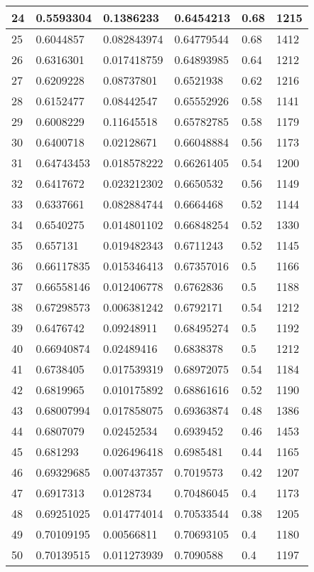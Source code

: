 \begin{longtable}{|l|l|l|l|l|l|}
24 & 0.5593304 & 0.1386233 & 0.6454213 & 0.68 & 1215 \\ \hline 
25 & 0.6044857 & 0.082843974 & 0.64779544 & 0.68 & 1412 \\ \hline 
26 & 0.6316301 & 0.017418759 & 0.64893985 & 0.64 & 1212 \\ \hline 
27 & 0.6209228 & 0.08737801 & 0.6521938 & 0.62 & 1216 \\ \hline 
28 & 0.6152477 & 0.08442547 & 0.65552926 & 0.58 & 1141 \\ \hline 
29 & 0.6008229 & 0.11645518 & 0.65782785 & 0.58 & 1179 \\ \hline 
30 & 0.6400718 & 0.02128671 & 0.66048884 & 0.56 & 1173 \\ \hline 
31 & 0.64743453 & 0.018578222 & 0.66261405 & 0.54 & 1200 \\ \hline 
32 & 0.6417672 & 0.023212302 & 0.6650532 & 0.56 & 1149 \\ \hline 
33 & 0.6337661 & 0.082884744 & 0.6664468 & 0.52 & 1144 \\ \hline 
34 & 0.6540275 & 0.014801102 & 0.66848254 & 0.52 & 1330 \\ \hline 
35 & 0.657131 & 0.019482343 & 0.6711243 & 0.52 & 1145 \\ \hline 
36 & 0.66117835 & 0.015346413 & 0.67357016 & 0.5 & 1166 \\ \hline 
37 & 0.66558146 & 0.012406778 & 0.6762836 & 0.5 & 1188 \\ \hline 
38 & 0.67298573 & 0.006381242 & 0.6792171 & 0.54 & 1212 \\ \hline 
39 & 0.6476742 & 0.09248911 & 0.68495274 & 0.5 & 1192 \\ \hline 
40 & 0.66940874 & 0.02489416 & 0.6838378 & 0.5 & 1212 \\ \hline 
41 & 0.6738405 & 0.017539319 & 0.68972075 & 0.54 & 1184 \\ \hline 
42 & 0.6819965 & 0.010175892 & 0.68861616 & 0.52 & 1190 \\ \hline 
43 & 0.68007994 & 0.017858075 & 0.69363874 & 0.48 & 1386 \\ \hline 
44 & 0.6807079 & 0.02452534 & 0.6939452 & 0.46 & 1453 \\ \hline 
45 & 0.681293 & 0.026496418 & 0.6985481 & 0.44 & 1165 \\ \hline 
46 & 0.69329685 & 0.007437357 & 0.7019573 & 0.42 & 1207 \\ \hline 
47 & 0.6917313 & 0.0128734 & 0.70486045 & 0.4 & 1173 \\ \hline 
48 & 0.69251025 & 0.014774014 & 0.70533544 & 0.38 & 1205 \\ \hline 
49 & 0.70109195 & 0.00566811 & 0.70693105 & 0.4 & 1180 \\ \hline 
50 & 0.70139515 & 0.011273939 & 0.7090588 & 0.4 & 1197 \\ \hline 
\end{longtable}